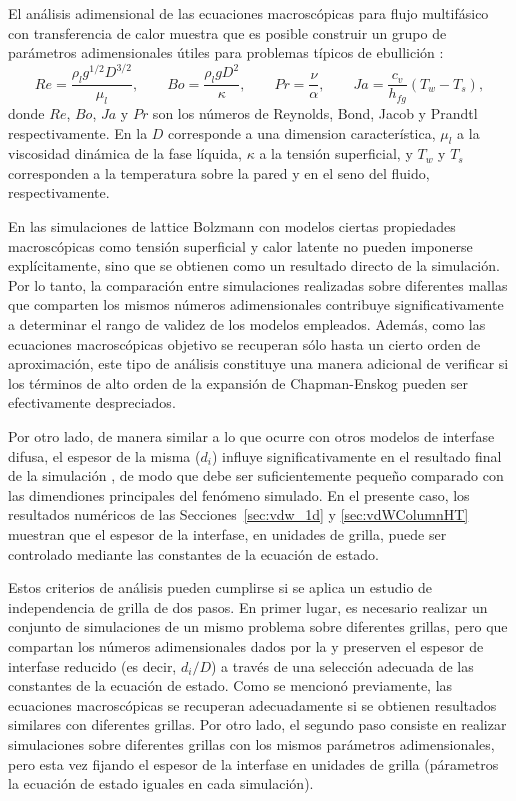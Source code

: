El an\'alisis adimensional de las ecuaciones macrosc\'opicas para flujo multif\'asico con transferencia de calor muestra que es posible construir un grupo de par\'ametros adimensionales \'utiles para problemas t\'ipicos de ebullici\'on \cite{ajaev_modeling_2006, hua_numerical_2007}:
\begin{equation}
	Re = \dfrac{\rho_l g^{1/2} D^{3/2}}{\mu_l}, \qquad
	Bo = \dfrac{\rho_l g D^2}{\kappa}, \qquad
	Pr = \dfrac{\nu}{\alpha}, \qquad
	Ja = \dfrac{c_v}{h_{fg}}(T_w-T_s),
	\label{eq:num_adim_hetb}
\end{equation}
donde $Re$, $Bo$, $Ja$ y $Pr$ son los n\'umeros de Reynolds, Bond, Jacob y Prandtl respectivamente. En la  $D$ corresponde a una dimension caracter\'istica, $\mu_l$ a la viscosidad din\'amica de la fase l\'iquida, $\kappa$ a la tensi\'on superficial, y $T_w$ y $T_s$ corresponden a la temperatura sobre la pared y en el seno del fluido, respectivamente. 

En las simulaciones de lattice Bolzmann con modelos \pp{} ciertas propiedades macrosc\'opicas como tensi\'on superficial y calor latente no pueden imponerse expl\'icitamente, sino que se obtienen como un resultado directo de la simulaci\'on. Por lo tanto, la comparaci\'on entre simulaciones realizadas sobre diferentes mallas que comparten los mismos n\'umeros adimensionales contribuye significativamente a determinar el rango de validez de los modelos empleados. Adem\'as, como las ecuaciones macrosc\'opicas objetivo se recuperan s\'olo hasta un cierto orden de aproximaci\'on, este tipo de an\'alisis constituye una manera adicional de verificar si los t\'erminos de alto orden de la expansi\'on de Chapman-Enskog pueden ser efectivamente despreciados.

Por otro lado, de manera similar a lo que ocurre con otros modelos de interfase difusa, el espesor de la misma ($d_i$) influye significativamente en el resultado final de la simulaci\'on \cite{ding_diffuse_2007}, de modo que debe ser suficientemente peque\~no comparado con las dimendiones principales del fen\'omeno simulado. En el presente caso, los resultados num\'ericos de las Secciones~\ref{sec:vdw_1d} y \ref{sec:vdWColumnHT} muestran que el espesor de la interfase, en unidades de grilla, puede ser controlado mediante las constantes de la ecuaci\'on de estado. 

Estos criterios de an\'alisis pueden cumplirse si se aplica un estudio de independencia de grilla de dos pasos. En primer lugar, es necesario realizar un conjunto de simulaciones de un mismo problema sobre diferentes grillas, pero que compartan los n\'umeros adimensionales dados por la  y preserven el espesor de interfase reducido (es decir, $d_i/D$) a trav\'es de una selecci\'on adecuada de las constantes de la ecuaci\'on de estado. Como se mencion\'o previamente, las ecuaciones macrosc\'opicas se recuperan adecuadamente si se obtienen resultados similares con diferentes grillas. Por otro lado, el segundo paso consiste en realizar simulaciones sobre diferentes grillas con los mismos par\'ametros adimensionales, pero esta vez fijando el espesor de la interfase en unidades de grilla (p\'arametros la ecuaci\'on de estado iguales en cada simulaci\'on). \newline

